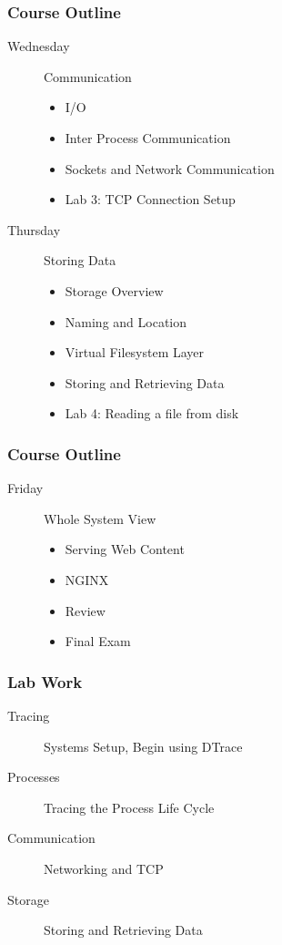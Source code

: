 \documentclass[pdftex]{beamer} %
\begin{document}
\begin{frame}
  \frametitle{Course Outline}
  \begin{description}
  \item[Wednesday] Communication
    \begin{itemize}
    \item I/O
    \item Inter Process Communication
    \item Sockets and Network Communication
    \item Lab 3: TCP Connection Setup
    \end{itemize}
  \item[Thursday] Storing Data
    \begin{itemize}
    \item Storage Overview
    \item Naming and Location
    \item Virtual Filesystem Layer
    \item Storing and Retrieving Data
    \item Lab 4: Reading a file from disk
    \end{itemize}
  \end{description}
\end{frame}

\begin{frame}
  \frametitle{Course Outline}
  \begin{description}
  \item[Friday] Whole System View
    \begin{itemize}
    \item Serving Web Content
    \item NGINX
    \item Review
    \item Final Exam
    \end{itemize}
  \end{description}
\end{frame}

\begin{frame}
  \frametitle{Lab Work}
  \begin{description}
  \item [Tracing] Systems Setup, Begin using DTrace
  \item [Processes] Tracing the Process Life Cycle
  \item [Communication] Networking and TCP
  \item [Storage] Storing and Retrieving Data
  \end{description}
\end{frame}
\end{document}
